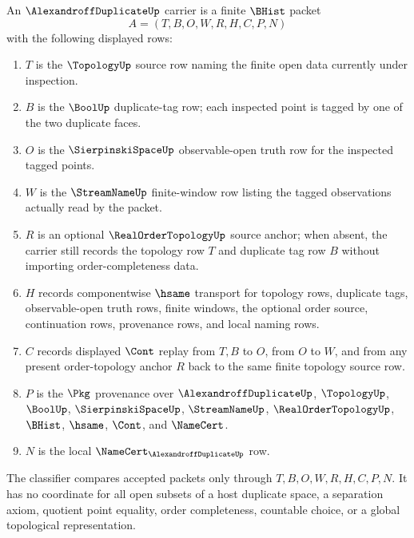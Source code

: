 \begin{definition}
\label{def:alexandroff-duplicate-carrier}
An $\AlexandroffDuplicateUp$ carrier is a finite $\BHist$ packet
$$
A=(T,B,O,W,R,H,C,P,N)
$$
with the following displayed rows:
\begin{enumerate}
\item $T$ is the $\TopologyUp$ source row naming the finite open data currently under inspection.
\item $B$ is the $\BoolUp$ duplicate-tag row; each inspected point is tagged by one of the two duplicate faces.
\item $O$ is the $\SierpinskiSpaceUp$ observable-open truth row for the inspected tagged points.
\item $W$ is the $\StreamNameUp$ finite-window row listing the tagged observations actually read by the packet.
\item $R$ is an optional $\RealOrderTopologyUp$ source anchor; when absent, the carrier still records the topology row $T$ and duplicate tag row $B$ without importing order-completeness data.
\item $H$ records componentwise $\hsame$ transport for topology rows, duplicate tags, observable-open truth rows, finite windows, the optional order source, continuation rows, provenance rows, and local naming rows.
\item $C$ records displayed $\Cont$ replay from $T,B$ to $O$, from $O$ to $W$, and from any present order-topology anchor $R$ back to the same finite topology source row.
\item $P$ is the $\Pkg$ provenance over $\AlexandroffDuplicateUp$, $\TopologyUp$, $\BoolUp$, $\SierpinskiSpaceUp$, $\StreamNameUp$, $\RealOrderTopologyUp$, $\BHist$, $\hsame$, $\Cont$, and $\NameCert$.
\item $N$ is the local $\NameCert_{\AlexandroffDuplicateUp}$ row.
\end{enumerate}
The classifier compares accepted packets only through $T,B,O,W,R,H,C,P,N$. It has no coordinate for all open subsets of a host duplicate space, a separation axiom, quotient point equality, order completeness, countable choice, or a global topological representation.
\end{definition}

